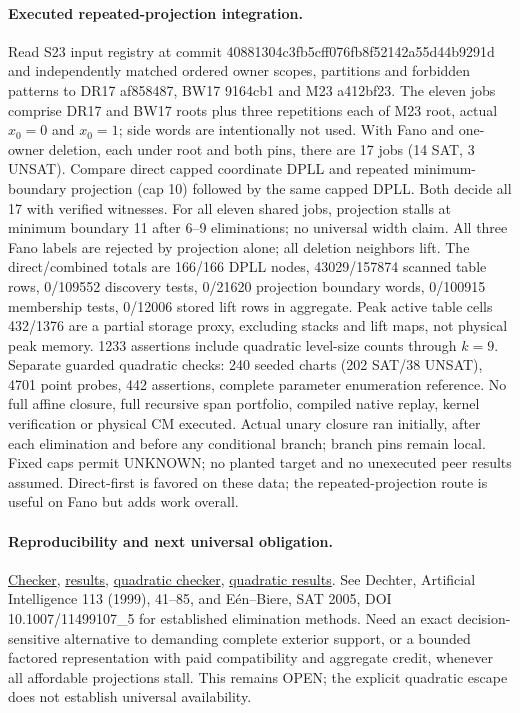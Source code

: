 \documentclass[11pt]{article}
\begin{document}
\paragraph{Executed repeated-projection integration.}
Read S23 input registry at commit 40881304c3fb5cff076fb8f52142a55d44b9291d and independently matched ordered owner scopes, partitions and forbidden patterns to DR17 af858487, BW17 9164cb1 and M23 a412bf23. The eleven jobs comprise DR17 and BW17 roots plus three repetitions each of M23 root, actual $x_0=0$ and $x_0=1$; side words are intentionally not used. With Fano and one-owner deletion, each under root and both pins, there are 17 jobs (14 SAT, 3 UNSAT). Compare direct capped coordinate DPLL and repeated minimum-boundary projection (cap 10) followed by the same capped DPLL. Both decide all 17 with verified witnesses. For all eleven shared jobs, projection stalls at minimum boundary 11 after 6--9 eliminations; no universal width claim. All three Fano labels are rejected by projection alone; all deletion neighbors lift. The direct/combined totals are 166/166 DPLL nodes, 43029/157874 scanned table rows, 0/109552 discovery tests, 0/21620 projection boundary words, 0/100915 membership tests, 0/12006 stored lift rows in aggregate. Peak active table cells 432/1376 are a partial storage proxy, excluding stacks and lift maps, not physical peak memory. 1233 assertions include quadratic level-size counts through $k=9$. Separate guarded quadratic checks: 240 seeded charts (202 SAT/38 UNSAT), 4701 point probes, 442 assertions, complete parameter enumeration reference. No full affine closure, full recursive span portfolio, compiled native replay, kernel verification or physical CM executed. Actual unary closure ran initially, after each elimination and before any conditional branch; branch pins remain local. Fixed caps permit UNKNOWN; no planted target and no unexecuted peer results assumed. Direct-first is favored on these data; the repeated-projection route is useful on Fano but adds work overall.
\paragraph{Reproducibility and next universal obligation.}
\href{https://github.com/j15marti/pnp/commit/f36d31a2d429237219a0a7652bf4ac6ecdab9bad}{Checker}, \href{https://github.com/j15marti/pnp/commit/19ef8cd3e41246a356f0271ed6ae70da64d7227c}{results}, \href{https://github.com/j15marti/pnp/commit/9c62d51fc65aba755aaa2b8f73cf404d2a707222}{quadratic checker}, \href{https://github.com/j15marti/pnp/commit/c5064330f5527ed4d382658364483f2f7287bcac}{quadratic results}. See Dechter, Artificial Intelligence 113 (1999), 41--85, and E\'en--Biere, SAT 2005, DOI 10.1007/11499107\_5 for established elimination methods. Need an exact decision-sensitive alternative to demanding complete exterior support, or a bounded factored representation with paid compatibility and aggregate credit, whenever all affordable projections stall. This remains OPEN; the explicit quadratic escape does not establish universal availability.
\end{document}
